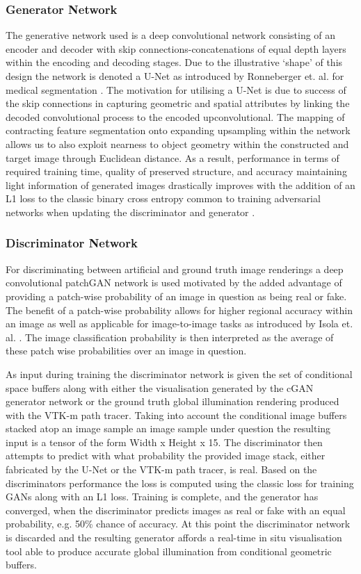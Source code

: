 \documentclass[conference]{IEEEtran}
\begin{document}
\subsubsection{Generator Network}

The generative network used is a deep convolutional network consisting of an encoder and decoder with skip connections-concatenations of equal depth layers within the encoding and decoding stages. Due to the illustrative `shape' of this design the network is denoted a U-Net as introduced by Ronneberger et. al. for medical segmentation \cite{ronnebergerUnet}. The motivation for utilising a U-Net is due to success of the skip connections in capturing geometric and spatial attributes by linking the decoded convolutional process to the encoded upconvolutional. The mapping of contracting feature segmentation onto expanding upsampling within the network allows us to also exploit nearness to object geometry within the constructed and target image through Euclidean distance. As a result, performance in terms of required training time, quality of preserved structure, and accuracy maintaining light information of generated images drastically improves with the addition of an L1 loss to the classic binary cross entropy common to training adversarial networks when updating the discriminator and generator  \cite{isolaL1}\cite{goodfellowGAN}. 

\subsubsection{Discriminator Network}

For discriminating between artificial and ground truth image renderings a deep convolutional patchGAN network is used motivated by the added advantage of providing a patch-wise probability of an image in question as being real or fake. The benefit of a patch-wise probability allows for higher regional accuracy within an image as well as applicable for image-to-image tasks as introduced by Isola et. al. \cite{isolaPatch}. The image classification probability is then interpreted as the average of these patch wise probabilities over an image in question. 

As input during training the discriminator network is given the set of conditional space buffers along with either the visualisation generated by the cGAN generator network or the ground truth global illumination rendering produced with the VTK-m path tracer. Taking into account the conditional image buffers stacked atop an image sample an image sample under question the resulting input is a tensor of the form Width x Height x 15. The discriminator then attempts to predict with what probability the provided image stack, either fabricated by the U-Net or the VTK-m path tracer, is real. Based on the discriminators performance the loss is computed using the classic loss for training GANs along with an L1 loss. Training is complete, and the generator has converged, when the discriminator predicts images as real or fake with an equal probability, e.g. 50\% chance of accuracy. At this point the discriminator network is discarded and the resulting generator affords a real-time in situ visualisation tool able to produce accurate global illumination from conditional geometric buffers.
\end{document}
